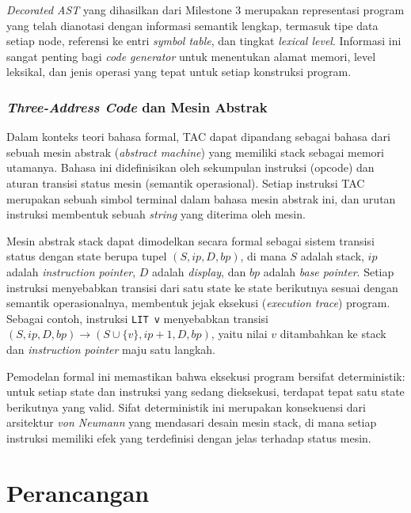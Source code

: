 \documentclass[12pt,a4paper]{article}
\begin{document}
\textit{Decorated AST} yang dihasilkan dari Milestone 3 merupakan representasi
program yang telah dianotasi dengan informasi semantik lengkap, termasuk tipe
data setiap node, referensi ke entri \textit{symbol table}, dan tingkat
\textit{lexical level}. Informasi ini sangat penting bagi \textit{code
generator} untuk menentukan alamat memori, level leksikal, dan jenis operasi
yang tepat untuk setiap konstruksi program.

\subsubsection{\textit{Three-Address Code} dan Mesin Abstrak}

Dalam konteks teori bahasa formal, TAC dapat dipandang sebagai bahasa dari
sebuah mesin abstrak (\textit{abstract machine}) yang memiliki stack sebagai
memori utamanya. Bahasa ini didefinisikan oleh sekumpulan instruksi (opcode)
dan aturan transisi status mesin (semantik operasional). Setiap instruksi TAC
merupakan sebuah simbol terminal dalam bahasa mesin abstrak ini, dan urutan
instruksi membentuk sebuah \textit{string} yang diterima oleh mesin.

Mesin abstrak stack dapat dimodelkan secara formal sebagai sistem transisi
status dengan state berupa tupel $(S, ip, D, bp)$, di mana $S$ adalah stack,
$ip$ adalah \textit{instruction pointer}, $D$ adalah \textit{display}, dan
$bp$ adalah \textit{base pointer}. Setiap instruksi menyebabkan transisi dari
satu state ke state berikutnya sesuai dengan semantik operasionalnya, membentuk
jejak eksekusi (\textit{execution trace}) program. Sebagai contoh, instruksi
\texttt{LIT v} menyebabkan transisi $(S, ip, D, bp) \rightarrow (S \cup
\{v\}, ip+1, D, bp)$, yaitu nilai $v$ ditambahkan ke stack dan \textit{instruction
pointer} maju satu langkah.

Pemodelan formal ini memastikan bahwa eksekusi program bersifat deterministik:
untuk setiap state dan instruksi yang sedang dieksekusi, terdapat tepat satu
state berikutnya yang valid. Sifat deterministik ini merupakan konsekuensi
dari arsitektur \textit{von Neumann} yang mendasari desain mesin stack, di mana
setiap instruksi memiliki efek yang terdefinisi dengan jelas terhadap status
mesin.



\section{Perancangan}
\end{document}
